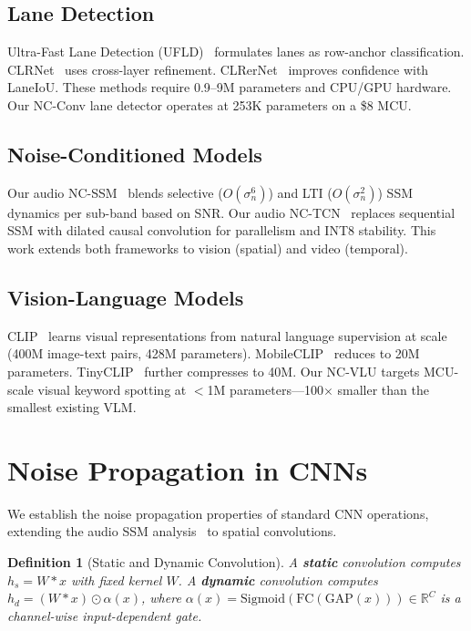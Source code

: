 \documentclass[journal]{IEEEtran}
\newtheorem{definition}{Definition}
\begin{document}
\subsection{Lane Detection}
Ultra-Fast Lane Detection (UFLD)~\cite{qin2020ultrafast} formulates lanes as row-anchor classification.
CLRNet~\cite{zheng2022clrnet} uses cross-layer refinement.
CLRerNet~\cite{clrernet2024} improves confidence with LaneIoU.
These methods require 0.9--9M parameters and CPU/GPU hardware.
Our NC-Conv lane detector operates at 253K parameters on a \$8 MCU.

\subsection{Noise-Conditioned Models}
Our audio NC-SSM~\cite{choi2026ncssm} blends selective ($O(\sigma_n^6)$) and LTI ($O(\sigma_n^2)$) SSM dynamics per sub-band based on SNR.
Our audio NC-TCN~\cite{choi2026nctcn} replaces sequential SSM with dilated causal convolution for parallelism and INT8 stability.
This work extends both frameworks to vision (spatial) and video (temporal).

\subsection{Vision-Language Models}
CLIP~\cite{radford2021clip} learns visual representations from natural language supervision at scale (400M image-text pairs, 428M parameters).
MobileCLIP~\cite{mobileclip2024} reduces to 20M parameters.
TinyCLIP~\cite{tinyclip2024} further compresses to 40M.
Our NC-VLU targets MCU-scale visual keyword spotting at $<$1M parameters---100$\times$ smaller than the smallest existing VLM.


\section{Noise Propagation in CNNs}
\label{sec:theory}

We establish the noise propagation properties of standard CNN operations, extending the audio SSM analysis~\cite{choi2026ncssm} to spatial convolutions.

\begin{definition}[Static and Dynamic Convolution]
\label{def:conv}
A \textbf{static} convolution computes $h_s = W * x$ with fixed kernel $W$.
A \textbf{dynamic} convolution computes $h_d = (W * x) \odot \alpha(x)$, where $\alpha(x) = \text{Sigmoid}(\text{FC}(\text{GAP}(x))) \in \mathbb{R}^C$ is a channel-wise input-dependent gate.
\end{definition}
\end{document}
